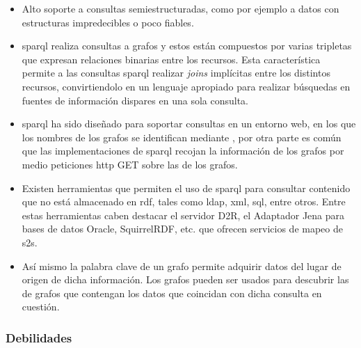 \begin{itemize}
	\item Alto soporte a consultas semiestructuradas, como por ejemplo a datos con estructuras impredecibles o poco fiables.

	\item \acrshort{sparql} realiza consultas a grafos  y estos están compuestos por varias tripletas que expresan relaciones binarias entre los recursos. Esta característica permite a las consultas \acrshort{sparql} realizar \textit{joins} implícitas entre los distintos recursos, convirtiendolo en un lenguaje apropiado para realizar búsquedas en fuentes de información dispares en una sola consulta.

	\item \acrshort{sparql} ha sido diseñado para soportar consultas en un entorno web, en los que los nombres de los grafos se identifican mediante , por otra parte es común que las implementaciones de \acrshort{sparql} recojan la información de los grafos por medio peticiones \acrshort{http} GET sobre las  de los grafos.

	\item Existen herramientas que permiten el uso de \acrshort{sparql} para consultar contenido que no está almacenado en \acrshort{rdf}, tales como \acrshort{ldap}, \acrshort{xml}, \acrshort{sql}, entre otros. Entre estas herramientas caben destacar el servidor D2R\cite{D2R_Server}, el Adaptador Jena para bases de datos Oracle\cite{JENA_ORACLE}, SquirrelRDF\cite{SquirrelRDF}, etc.\cite{MAPING_SPARQL} que ofrecen servicios de mapeo de \acrfull{s2s}.

	\item Así mismo la palabra clave de un grafo permite adquirir datos del lugar de origen de dicha información. Los grafos pueden ser usados para descubrir las  de grafos que contengan los datos que coincidan con dicha consulta en cuestión.
\end{itemize}

\subsubsection{Debilidades}

